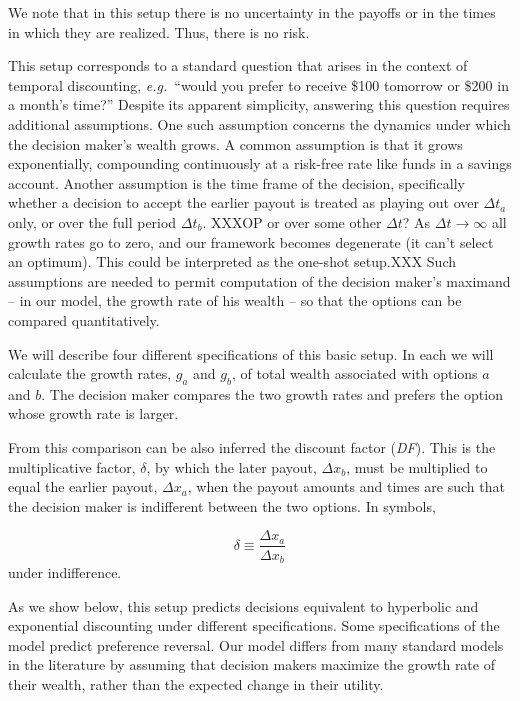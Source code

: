\documentclass[11pt]{article}
\newcommand{\Sref}[1]{Section~\ref{sec:#1}}
\newcommand{\eg}{{\it e.g.}\ }
\newcommand{\be}{\begin{equation}}
\newcommand{\ee}{\end{equation}}
\newcommand{\Dt}{\Delta t}
\newcommand{\Dx}{\Delta x}
\numberwithin{equation}{section}
\begin{document}
We note that in this setup there is no uncertainty in the payoffs or in the times in which they are realized. Thus, there is no risk.

This setup corresponds to a standard question that arises in the context of temporal discounting, \eg ``would you prefer to receive \$100 tomorrow or \$200 in a month's time?'' Despite its apparent simplicity, answering this question requires additional assumptions. One such assumption concerns the dynamics under which the decision maker's wealth grows. A common assumption is that it grows exponentially, compounding continuously at a risk-free rate like funds in a savings account. Another assumption is the time frame of the decision, specifically whether a decision to accept the earlier payout is treated as playing out over $\Dt_a$ only, or over the full period $\Dt_b$. XXXOP or over some other $\Delta t$? As $\Delta t \to \infty$ all growth rates go to zero, and our framework becomes degenerate (it can't select an optimum). This could be interpreted as the one-shot setup.XXX
Such assumptions are needed to permit computation of the decision maker's maximand -- in our model, the growth rate of his wealth -- so that the options can be compared quantitatively.

We will describe four different specifications of this basic setup. In each we will calculate the growth rates, $g_a$ and $g_b$, of total wealth associated with options $a$ and $b$. The decision maker compares the two growth rates and prefers the option whose growth rate is larger.

From this comparison can be also inferred the discount factor (\textit{DF}). This is the multiplicative factor, $\delta$, by which the later payout, $\Dx_b$, must be multiplied to equal the earlier payout, $\Dx_a$, when the payout amounts and times are such that the decision maker is indifferent between the two options. In symbols,

\be
\delta \equiv \frac{\Dx_a}{\Dx_b}
\ee
under indifference.

As we show below, this setup predicts decisions equivalent to hyperbolic and exponential discounting under different specifications. Some specifications of the model predict preference reversal. Our model differs from many standard models in the literature by assuming that decision makers maximize the growth rate of their wealth, rather than the expected change in their utility.
\end{document}
